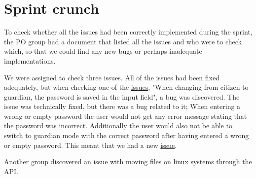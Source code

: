 \section{Sprint crunch}
To check whether all the issues had been correctly implemented during the sprint, the PO group had a document that listed all the issues and who were to check which, so that we could find any new bugs or perhaps inadequate implementations.

We were assigned to check three issues.
All of the issues had been fixed adequately, but when checking one of the \href{https://github.com/aau-giraf/weekplanner/issues/128}{issues}, "When changing from citizen to guardian, the password is saved in the input field", a bug was discovered.
The issue was technically fixed, but there was a bug related to it; When entering a wrong or empty password the user would not get any error message stating that the password was incorrect.
Additionally the user would also not be able to switch to guardian mode with the correct password after having entered a wrong or empty password.
This meant that we had a new \href{https://github.com/aau-giraf/weekplanner/issues/253}{issue}.



Another group discovered an issue with moving files on linux systems through the API.

